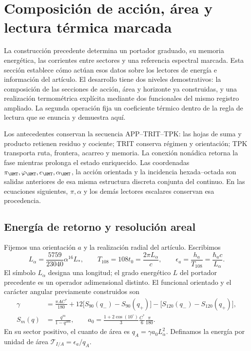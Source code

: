 \section{Composición de acción, área y lectura térmica marcada}
\label{sec:ii-termica-marcada}

La construcción precedente determina un portador graduado, su memoria
energética, las corrientes entre sectores y una referencia espectral marcada.
Esta sección establece cómo actúan esos datos sobre los lectores de energía
e información del artículo. El desarrollo tiene dos niveles demostrativos:
la composición de las secciones de acción, área y horizonte ya construidas,
y una realización termométrica explícita mediante dos funcionales del mismo
registro ampliado. La segunda operación fija un coeficiente térmico dentro
de la regla de lectura que se enuncia y demuestra aquí.

Los antecedentes conservan la secuencia APP--TRIT--TPK: las hojas de suma
y producto retienen residuo y cociente; TRIT conserva régimen y orientación;
TPK transporta ruta, frontera, acarreo y memoria. La conexión nonádica retorna
la fase mientras prolonga el estado enriquecido. Las coordenadas
$\pi_{\HMT},\varphi_{\HMT},e_{\HMT},\alpha_{\HMT}$, la acción
orientada y la incidencia hexada--octada son salidas anteriores de esa misma
estructura discreta conjunta del continuo. En las ecuaciones siguientes,
$\pi,\alpha$ y los demás lectores escalares conservan esa procedencia.

\subsection{Energía de retorno y resolución areal}
\label{subsec:ii-termica-accion-area}

Fijemos una orientación $a$ y la realización radial del artículo. Escribimos
\begin{equation}
 L_\alpha=\frac{5759}{23040}\alpha^{16}L_* ,\qquad
 T_{108}=108t_0=\frac{2\pi L_\alpha}{c},\qquad
 \epsilon_a=\frac{h_a}{T_{108}}=\frac{\hbar_a c}{L_\alpha}.
 \label{eq:ii-ter27-energia}
\end{equation}
El símbolo $L_\alpha$ designa una longitud; el grado energético $L$ del
portador precedente es un operador adimensional distinto. El funcional
orientado y el carácter angular previamente construidos son
\begin{align}
 \gamma&=\frac{\pi AC^*}{180}
 +12\bigl[S_{90}(q_-)-S_{90}(q_+)\bigr]
 -\bigl[S_{120}(q_-)-S_{120}(q_+)\bigr],\nonumber\\
 S_m(q)&=\frac{q^m}{1-q^{3m}},\qquad
 a_0=\frac{1+2\cos(10^\circ)}3\frac{C^*}{6}\frac{\pi}{180}.
 \label{eq:ii-ter27-barbero}
\end{align}
En su sector positivo, el cuanto de área es
$q_A=\gamma a_0L_\alpha^2$. Definamos la energía por unidad de área
$\mathcal T_{I/A}=\epsilon_a/q_A$.

